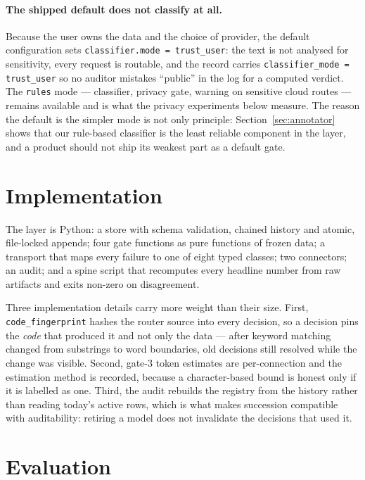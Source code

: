 \documentclass[11pt]{article}
\newcommand{\code}[1]{\texttt{#1}}
\begin{document}
\paragraph{The shipped default does not classify at all.} Because the user owns the data and the
choice of provider, the default configuration sets \code{classifier.mode = trust\_user}: the text
is not analysed for sensitivity, every request is routable, and the record carries
\code{classifier\_mode = trust\_user} so no auditor mistakes ``public'' in the log for a computed
verdict. The \code{rules} mode --- classifier, privacy gate, warning on sensitive cloud routes ---
remains available and is what the privacy experiments below measure. The reason the default is the
simpler mode is not only principle: Section~\ref{sec:annotator} shows that our rule-based
classifier is the least reliable component in the layer, and a product should not ship its weakest
part as a default gate.

\section{Implementation}

The layer is Python: a store with schema validation, chained history and atomic, file-locked
appends; four gate functions as pure functions of frozen data; a transport that maps every
failure to one of eight typed classes; two connectors; an audit; and a spine script that
recomputes every headline number from raw artifacts and exits non-zero on disagreement.

Three implementation details carry more weight than their size. First, \code{code\_fingerprint}
hashes the router source into every decision, so a decision pins the \emph{code} that produced
it and not only the data --- after keyword matching changed from substrings to word boundaries,
old decisions still resolved while the change was visible. Second, gate-3 token estimates are
per-connection and the estimation method is recorded, because a character-based bound is honest
only if it is labelled as one. Third, the audit rebuilds the registry from the history rather
than reading today's active rows, which is what makes succession compatible with auditability:
retiring a model does not invalidate the decisions that used it.

\section{Evaluation}
\end{document}
